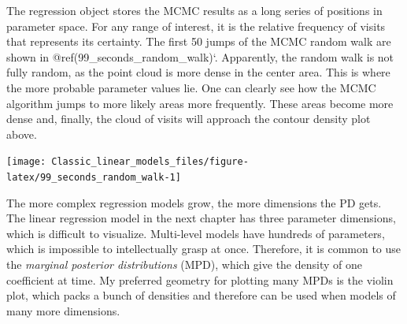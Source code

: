 \documentclass[]{svmono}
\newenvironment{Shaded}{\begin{snugshade}}{\end{snugshade}}
\newcommand{\KeywordTok}[1]{\textcolor[rgb]{0.13,0.29,0.53}{\textbf{#1}}}
\newcommand{\DataTypeTok}[1]{\textcolor[rgb]{0.13,0.29,0.53}{#1}}
\newcommand{\DecValTok}[1]{\textcolor[rgb]{0.00,0.00,0.81}{#1}}
\newcommand{\StringTok}[1]{\textcolor[rgb]{0.31,0.60,0.02}{#1}}
\newcommand{\OperatorTok}[1]{\textcolor[rgb]{0.81,0.36,0.00}{\textbf{#1}}}
\newcommand{\NormalTok}[1]{#1}
\begin{document}
The regression object stores the MCMC results as a long series of
positions in parameter space. For any range of interest, it is the
relative frequency of visits that represents its certainty. The first 50
jumps of the MCMC random walk are shown in
@ref(99\_seconds\_random\_walk)`. Apparently, the random walk is not
fully random, as the point cloud is more dense in the center area. This
is where the more probable parameter values lie. One can clearly see how
the MCMC algorithm jumps to more likely areas more frequently. These
areas become more dense and, finally, the cloud of visits will approach
the contour density plot above.

\begin{Shaded}
\end{Shaded}

\texttt{[image: Classic\_linear\_models\_files/figure-latex/99\_seconds\_random\_walk-1]}

The more complex regression models grow, the more dimensions the PD
gets. The linear regression model in the next chapter has three
parameter dimensions, which is difficult to visualize. Multi-level
models have hundreds of parameters, which is impossible to
intellectually grasp at once. Therefore, it is common to use the
\emph{marginal posterior distributions} (MPD), which give the density of
one coefficient at time. My preferred geometry for plotting many MPDs is
the violin plot, which packs a bunch of densities and therefore can be
used when models of many more dimensions.
\end{document}
